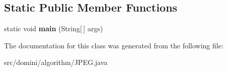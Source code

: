 \subsection*{Static Public Member Functions}
\begin{DoxyCompactItemize}
\item 
\mbox{\label{classdomini_1_1algorithm_1_1JPEG_a049a54398fe4b90620d0ac1ea1fdf780}} 
static void {\bfseries main} (String\mbox{[}$\,$\mbox{]} args)
\end{DoxyCompactItemize}


The documentation for this class was generated from the following file\+:\begin{DoxyCompactItemize}
\item 
src/domini/algorithm/J\+P\+E\+G.\+java\end{DoxyCompactItemize}
